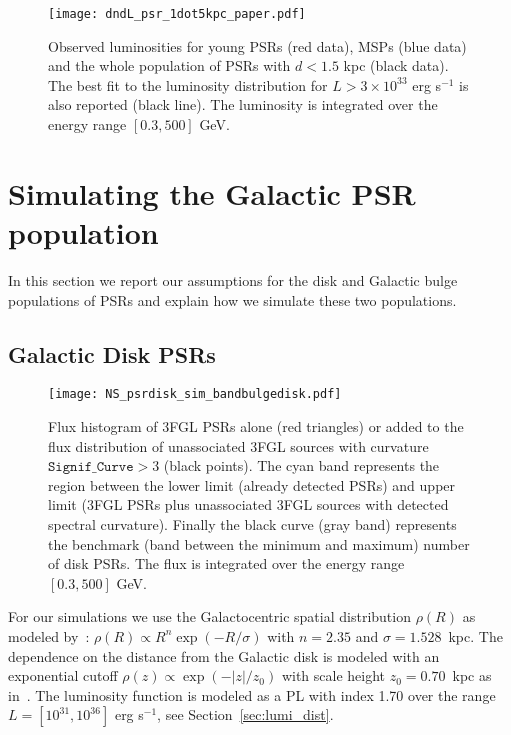 \documentclass[iop]{emulateapj}
\begin{document}
\begin{figure}
	\centering
\texttt{[image: dndL\_psr\_1dot5kpc\_paper.pdf]}
\caption{Observed luminosities for young PSRs (red data),
  MSPs (blue data) and the whole population of PSRs with $d<1.5$ kpc (black data). The best fit
  to the luminosity distribution for $L> 3\times 10^{33}$ erg s$^{-1}$ is also reported (black line).  
  The luminosity is
  integrated over the energy range $[0.3,500]$ GeV.}
\label{fig:dNdLN} 
\end{figure}



\section{Simulating the Galactic PSR population}
\label{sec:gal_dist}

In this section we report our assumptions for the disk and Galactic bulge populations of PSRs
and explain how we simulate these two populations.

\subsection{Galactic Disk PSRs}
\label{sec:disk_dist}
\begin{figure}
	\centering
\texttt{[image: NS\_psrdisk\_sim\_bandbulgedisk.pdf]}
\caption{Flux histogram of 3FGL PSRs alone (red triangles) or added to
  the flux distribution of unassociated 3FGL sources with curvature
  $\texttt{Signif\_Curve}>3$ (black points). The cyan band
  represents the region between the lower limit (already
  detected PSRs) and upper limit (3FGL PSRs plus unassociated 3FGL
  sources with detected spectral curvature). Finally the black curve
  (gray band) represents the benchmark (band between the minimum and
  maximum) number of disk PSRs.   The flux is integrated over the
  energy range $[0.3,500]$ GeV.}
\label{fig:Sdisk} 
\end{figure}

For our simulations we use the Galactocentric spatial distribution
$\rho(R)$ as modeled by~\citet{2004IAUS..218..105L}:
$\rho(R) \propto R^{n} \exp{(-R/\sigma)}$ with $n=2.35$ and
$\sigma=1.528$~kpc. The dependence on the distance from the Galactic disk is
modeled with an exponential cutoff $\rho(z)\propto \exp{(-|z|/z_0)}$ with
scale height $z_0=0.70$~kpc as in~\citet{Calore:2014oga}. The luminosity
function is modeled as a PL with index 1.70 over the range
$L=[10^{31},10^{36}]$ erg s$^{-1}$, see Section~\ref{sec:lumi_dist}.   
\end{document}
